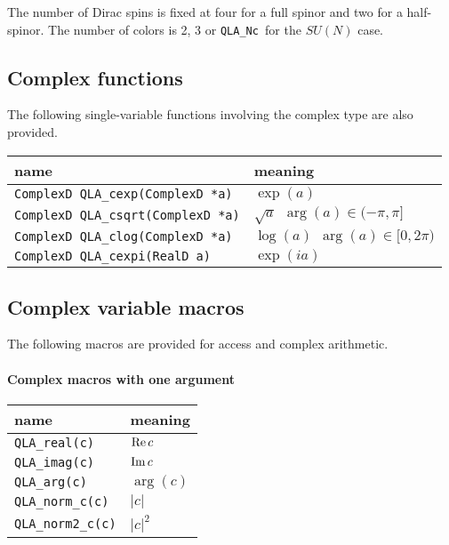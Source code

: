 \documentclass{article}
\renewcommand{\Re}{\mathop{\rm Re}}
\renewcommand{\Im}{\mathop{\rm Im}}
\newcommand{\ttdash}{{\tt \_}}
\newcommand{\qlaNcMacro}{{\tt QLA}\ttdash{\tt Nc }}
\begin{document}
The number of Dirac spins is fixed at four for a full spinor and two
for a half-spinor.  The number of colors is 2, 3 or \qlaNcMacro for
the $SU(N)$ case.

\subsection{Complex functions}

The following single-variable functions involving the complex type are
also provided.

\begin{center}
\begin{tabular}{|l|l|}
\hline
  name           & meaning      \\
\hline
{\tt ComplexD QLA}\ttdash{\tt cexp(ComplexD *a) }  & $\exp(a)$ \\
{\tt ComplexD QLA}\ttdash{\tt csqrt(ComplexD *a)}  & $\sqrt{a} \ \ \arg(a) \in (-\pi,\pi]$ \\
{\tt ComplexD QLA}\ttdash{\tt clog(ComplexD *a) }  & $\log(a)  \ \ \arg(a) \in [0, 2\pi)$ \\
{\tt ComplexD QLA}\ttdash{\tt cexpi(RealD a)    }  & $\exp(ia)$ \\
\hline
\end{tabular}
\end{center}


\subsection{Complex variable macros}

The following macros are provided for access and complex arithmetic.

\paragraph{Complex macros with one argument}
\begin{center}
\begin{tabular}{|l|l|}
\hline
  name           & meaning      \\
\hline
\verb|QLA_real(c)   |  & $\Re c$   \\
\verb|QLA_imag(c)   |  & $\Im c$   \\
\verb|QLA_arg(c)    |  & $\arg(c)$ \\
\verb|QLA_norm_c(c) |  & $|c|$     \\
\verb|QLA_norm2_c(c)|  & $|c|^2$   \\
\hline
\end{tabular}
\end{center}
\end{document}
